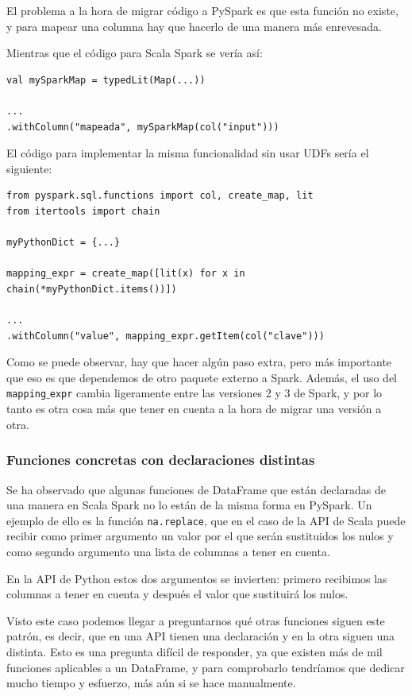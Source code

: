 \documentclass[12pt,twoside,titlepage]{report}
\begin{document}
El problema a la hora de migrar código a PySpark es que esta función no existe, y para mapear una columna hay que hacerlo de una manera más enrevesada.

Mientras que el código para Scala Spark se vería así:

\begin{lstlisting}
val mySparkMap = typedLit(Map(...))

...
.withColumn("mapeada", mySparkMap(col("input")))
\end{lstlisting}

El código para implementar la misma funcionalidad sin usar UDFs sería el siguiente:

\begin{lstlisting}
from pyspark.sql.functions import col, create_map, lit
from itertools import chain

myPythonDict = {...}

mapping_expr = create_map([lit(x) for x in chain(*myPythonDict.items())])

...
.withColumn("value", mapping_expr.getItem(col("clave")))
\end{lstlisting}

Como se puede observar, hay que hacer algún paso extra, pero más importante que eso es que dependemos de otro paquete externo a Spark. Además, el uso del \texttt{mapping$\_$expr} cambia ligeramente entre las versiones 2 y 3 de Spark, y por lo tanto es otra cosa más que tener en cuenta a la hora de migrar una versión a otra.

\subsubsection{Funciones concretas con declaraciones distintas}

Se ha observado que algunas funciones de DataFrame que están declaradas de una manera en Scala Spark no lo están de la misma forma en PySpark. Un ejemplo de ello es la función \texttt{na.replace}, que en el caso de la API de Scala puede recibir como primer argumento un valor por el que serán sustituidos los nulos y como segundo argumento una lista de columnas a tener en cuenta.

En la API de Python estos dos argumentos se invierten: primero recibimos las columnas a tener en cuenta y después el valor que sustituirá los nulos.

Visto este caso podemos llegar a preguntarnos qué otras funciones siguen este patrón, es decir, que en una API tienen una declaración y en la otra siguen una distinta. Esto es una pregunta difícil de responder, ya que existen más de mil funciones aplicables a un DataFrame, y para comprobarlo tendríamos que dedicar mucho tiempo y esfuerzo, más aún si se hace manualmente.
\end{document}
